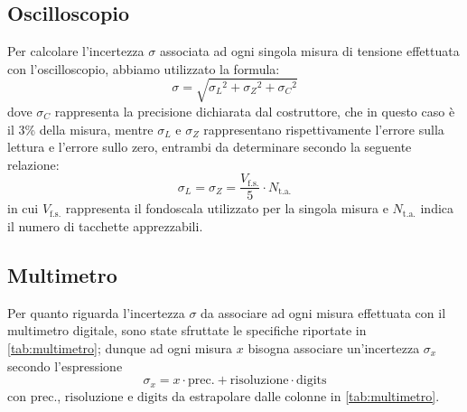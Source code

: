 \subsection{Oscilloscopio}
Per calcolare l’incertezza $\sigma$ associata ad ogni singola misura di tensione effettuata con l’oscilloscopio, abbiamo utilizzato la formula: 
\begin{equation*}
    \sigma = \sqrt{{\sigma_L}^2 + {\sigma_Z}^2 + {\sigma_C}^2 }
\end{equation*}
dove $\sigma_C$ rappresenta la precisione dichiarata dal costruttore, che in questo caso è il 3\% della misura, mentre $\sigma_L$ e $\sigma_Z$  rappresentano rispettivamente l’errore sulla lettura e l’errore sullo zero, entrambi da determinare secondo la seguente relazione:
\begin{equation*}
    \sigma_L = \sigma_Z = \dfrac{V_\text{f.s.}}{5} \cdot N_\text{t.a.}
\end{equation*}
in cui $V_\text{f.s.}$ rappresenta il fondoscala utilizzato per la singola misura e $N_\text{t.a.}$ indica il numero di tacchette apprezzabili.

\subsection{Multimetro}
Per quanto riguarda l'incertezza $\sigma$ da associare ad ogni misura effettuata con il multimetro digitale, sono state sfruttate le specifiche riportate in \autoref{tab:multimetro}; dunque ad ogni misura $x$ bisogna associare un'incertezza $\sigma_x$ secondo l'espressione
\begin{equation*}
    \sigma_x = x \cdot \text{prec.} + \text{risoluzione} \cdot \text{digits} 
\end{equation*}
con $\text{prec.}$, $\text{risoluzione}$ e $\text{digits}$ da estrapolare dalle colonne in \autoref{tab:multimetro}.